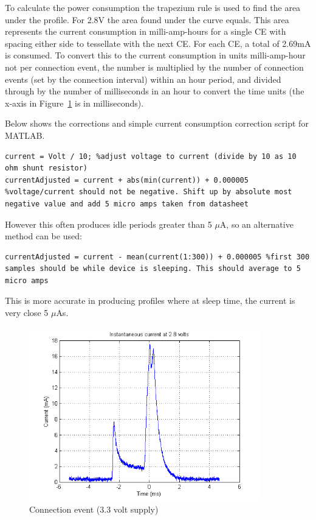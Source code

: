 \documentclass[]{article}
\begin{document}
To calculate the power consumption the trapezium rule is used to find the area under the profile. For 2.8V the area found under the curve equals. This area represents the current consumption in milli-amp-hours for a single \ac{CE} with spacing either side to tessellate with the next \ac{CE}. For each \ac{CE}, a total of 2.69mA is consumed.  To convert this to the current consumption in units milli-amp-hour not per connection event, the number is multiplied by the number of connection events (set by the connection interval) within an hour period, and divided through by the number of milliseconds in an hour to convert the time units (the x-axis in Figure~\ref{fig:icur2.8} is in milliseconds). 

Below shows the corrections and simple current consumption correction script for MATLAB. 

\begin{lstlisting}
current = Volt / 10; %adjust voltage to current (divide by 10 as 10 ohm shunt resistor)
currentAdjusted = current + abs(min(current)) + 0.000005 %voltage/current should not be negative. Shift up by absolute most negative value and add 5 micro amps taken from datasheet
\end{lstlisting}

However this often produces idle periods greater than 5 $\mu$A, so an alternative method can be used:

\begin{lstlisting}
currentAdjusted = current - mean(current(1:300)) + 0.000005 %first 300 samples should be while device is sleeping. This should average to 5 micro amps
\end{lstlisting}

This is more accurate in producing profiles where at sleep time, the current is very close 5 $\mu$As.

\begin{figure}[H]
	\begin{center}
		\includegraphics[width = 0.9\textwidth]{icur28}
	\end{center}
	\caption{Connection event (3.3 volt supply)}
	\label{fig:icur2.8}
\end{figure}
\end{document}
